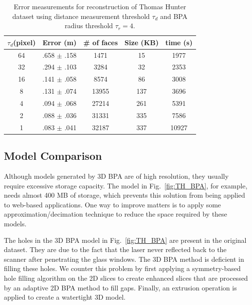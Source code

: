 \documentclass[10pt,twocolumn,letterpaper]{article}
\newcommand{\Fig}[1]{Fig.~\ref{fig:#1}}
\begin{document}
\setlength{\tabcolsep}{4pt}
\begin{table}[hbtp]
\begin{center}
\begin{tabular}[t]{||c||c|c|c|c||}
\hline
$\tau_d $(pixel) & Error (m)& \# of faces & Size (KB) & time (s) \\ \hline \hline
64 & .658 $\pm$ .158 & 1471  & 15  & 1977 \\ \hline 
32 & .294 $\pm$ .103 & 3284  & 32  & 2353 \\ \hline
16 & .141 $\pm$ .058 & 8574  & 86  & 3008 \\ \hline
8  & .131 $\pm$ .074 & 13955 & 137 & 3696 \\ \hline
4  & .094 $\pm$ .068 & 27214 & 261 & 5391 \\ \hline
2  & .088 $\pm$ .036 & 31331 & 335 & 7586 \\ \hline
1  & .083 $\pm$ .041 & 32187 & 337 & 10927\\ \hline
\end{tabular}
\end{center}
\caption{Error measurements for reconstruction of Thomas Hunter dataset using
distance measurement threshold $\tau_d$ and BPA radius threshold $\tau_r = 4$.}
\label{tbl:em}
\end{table}
\setlength{\tabcolsep}{1.4pt}

\subsection{Model Comparison}

Although models generated by 3D BPA are of high resolution, they usually
require excessive storage capacity.
The model in \Fig{TH_BPA}, for example, needs almost 400 MB of storage,
which prevents this solution from being applied to web-based applications.
One way to improve matters is to apply some approximation/decimation
technique to reduce the space required by these models.

The holes in the 3D BPA model in \Fig{TH_BPA} are present in the
original dataset.
They are due to the fact that the laser never reflected back to
the scanner after penetrating the glass windows.
The 3D BPA method is deficient in filling these holes.
We counter this problem by first applying a symmetry-based hole filling
algorithm on the 2D slices to create enhanced slices that are processed
by an adaptive 2D BPA method to fill gaps.
Finally, an extrusion operation is applied to create a watertight 3D model.
\end{document}
